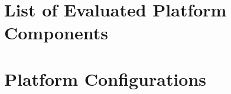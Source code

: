 \chapter{List of Evaluated Platform Components}
\label{chapter:first-appendix}





\chapter{Platform Configurations}
\label{chapter:appendixb}


